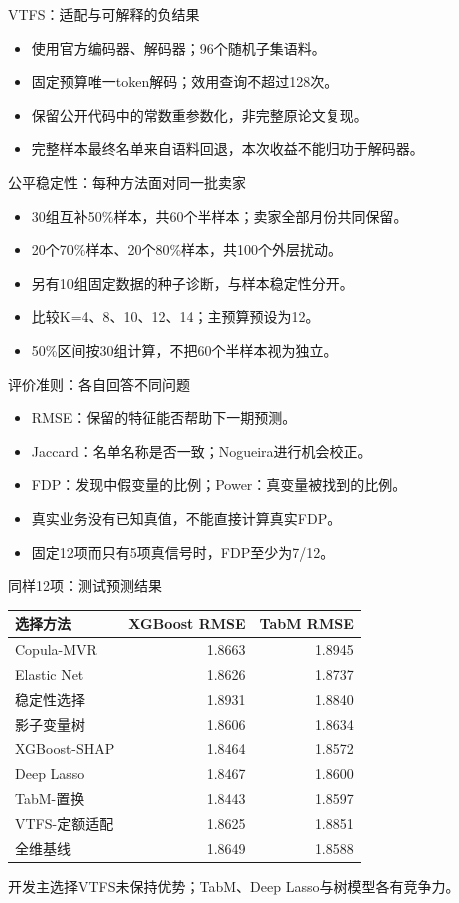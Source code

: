 \documentclass[aspectratio=169]{beamer}
\begin{document}
\begin{frame}{VTFS：适配与可解释的负结果}
\begin{itemize}
\item 使用官方编码器、解码器；96个随机子集语料。
\item 固定预算唯一token解码；效用查询不超过128次。
\item 保留公开代码中的常数重参数化，非完整原论文复现。
\item 完整样本最终名单来自语料回退，本次收益不能归功于解码器。
\end{itemize}
\end{frame}
\begin{frame}{公平稳定性：每种方法面对同一批卖家}
\begin{itemize}
\item 30组互补50\%样本，共60个半样本；卖家全部月份共同保留。
\item 20个70\%样本、20个80\%样本，共100个外层扰动。
\item 另有10组固定数据的种子诊断，与样本稳定性分开。
\item 比较K=4、8、10、12、14；主预算预设为12。
\item 50\%区间按30组计算，不把60个半样本视为独立。
\end{itemize}
\end{frame}
\begin{frame}{评价准则：各自回答不同问题}
\begin{itemize}
\item RMSE：保留的特征能否帮助下一期预测。
\item Jaccard：名单名称是否一致；Nogueira进行机会校正。
\item FDP：发现中假变量的比例；Power：真变量被找到的比例。
\item 真实业务没有已知真值，不能直接计算真实FDP。
\item 固定12项而只有5项真信号时，FDP至少为7/12。
\end{itemize}
\end{frame}
\begin{frame}{同样12项：测试预测结果}
\footnotesize \begin{tabular}{lrr}
\toprule
选择方法 & XGBoost RMSE & TabM RMSE\\\midrule
Copula-MVR & 1.8663 & 1.8945\\
Elastic Net & 1.8626 & 1.8737\\
稳定性选择 & 1.8931 & 1.8840\\
影子变量树 & 1.8606 & 1.8634\\
XGBoost-SHAP & 1.8464 & 1.8572\\
Deep Lasso & 1.8467 & 1.8600\\
TabM-置换 & 1.8443 & 1.8597\\
VTFS-定额适配 & 1.8625 & 1.8851\\
全维基线 & 1.8649 & 1.8588\\
\bottomrule
\end{tabular}\vspace{0.4em}\par\small 开发主选择VTFS未保持优势；TabM、Deep Lasso与树模型各有竞争力。
\end{frame}
\end{document}
